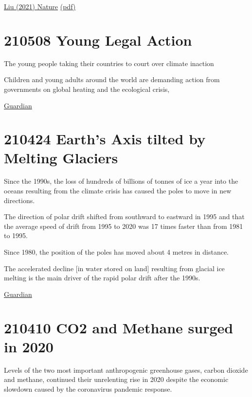 \documentclass[
]{book}
\begin{document}
\href{https://www.nature.com/articles/s43247-021-00097-8}{Liu (2021) Nature}
\href{pdf/Liu_2021_NDC_80pct_2C.pdf}{(pdf)}

\hypertarget{young-legal-action}{%
\section{210508 Young Legal Action}\label{young-legal-action}}

The young people taking their countries to court over climate inaction

Children and young adults around the world are demanding action from governments on global heating and the ecological crisis,

\href{https://www.theguardian.com/environment/2021/may/07/the-young-people-taking-their-countries-to-court-over-climate-inaction}{Guardian}

\hypertarget{earths-axis-tilted-by-melting-glaciers}{%
\section{210424 Earth's Axis tilted by Melting Glaciers}\label{earths-axis-tilted-by-melting-glaciers}}

Since the 1990s, the loss of hundreds of billions of tonnes of ice a year into the oceans resulting from the climate crisis has caused the poles to move in new directions.

The direction of polar drift shifted from southward to eastward in 1995 and that the average speed of drift from 1995 to 2020 was 17 times faster than from 1981 to 1995.

Since 1980, the position of the poles has moved about 4 metres in distance.

The accelerated decline {[}in water stored on land{]} resulting from glacial ice melting is the main driver of the rapid polar drift after the 1990s.

\href{https://www.theguardian.com/environment/2021/apr/23/climate-crisis-has-shifted-the-earths-axis-study-shows}{Guardian}

\hypertarget{co2-and-methane-surged-in-2020}{%
\section{210410 CO2 and Methane surged in 2020}\label{co2-and-methane-surged-in-2020}}

Levels of the two most important anthropogenic greenhouse gases, carbon dioxide and methane, continued their unrelenting rise in 2020 despite the economic slowdown caused by the coronavirus pandemic response.
\end{document}
